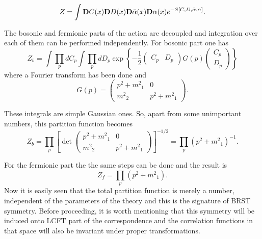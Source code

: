 \documentclass[a4paper,11pt]{article}
\begin{document}
\begin{equation}
Z=\int{\rm\bf D}C(x){\rm\bf D}D(x){\bf D}\bar{\alpha}(x){\bf
D}\alpha(x)e^{-S[C,D,\bar{\alpha},\alpha]}.
\end{equation}

The bosonic and fermionic parts of the action are decoupled and
integration over each of them can be performed independently. For
bosonic part one has
\begin{equation}
Z_{b} = \int\prod_pdC_{p}\int\prod_pdD_p\exp \left\{-\frac{1}{2}
(\begin{array}{ll} C_p & D_p
\end{array})
G(p) \left(\begin{array}{l}
C_p \\
D_p
\end{array}\right)\right\}
\end{equation}
where a Fourier transform has been done and
\begin{equation}
G(p)=\left(\begin{array}{cc}
  p^2+{m^2}_1 & 0 \\
  {m^2}_2 & p^2+{m^2}_1
\end{array}\right).
\end{equation}

These integrals are simple Gaussian ones. So, apart from some
unimportant numbers, this partition function becomes
\begin{equation}
Z_b=\prod_p\left[\det\left(\begin{array}{cc}
  p^2+{m^2}_1 & 0 \\
  {m^2}_2 & p^2+{m^2}_1
\end{array}\right)\right]^{-1/2}=\prod_p(p^2+{m^2}_1)^{-1}.
\end{equation}

For the fermionic part the the same steps can be done and the
result is
\begin{equation}
Z_f=\prod_p(p^2+{m^2}_1).
\end{equation}
Now it is easily seen that the total partition function is merely
a number, independent of the parameters of the theory and this is
the signature of BRST symmetry. Before proceeding, it is worth
mentioning that this symmetry will be induced onto LCFT part of
the correspondence and the correlation functions in that space
will also be invariant under proper transformations.
\end{document}
